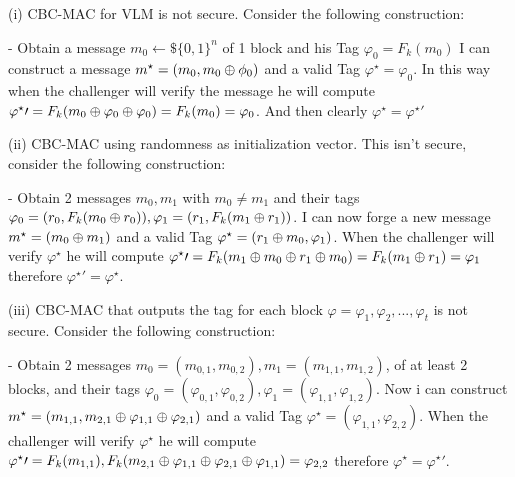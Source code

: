 \documentclass[11pt]{article}
\newcounter{t0d0_counter}
\begin{document}
\begin{figure}[h!]
   \centering
   \sdinit{}
\end{figure}

(i)
CBC-MAC for VLM is not secure. Consider the following construction:

- Obtain a message $m_0\leftarrow\$\{0,1\}^n$ of 1 block and his Tag $\varphi_0 =F_k(m_0)$
I can construct a message $m^\star=(m_0,m_0\oplus \phi_0)$ and a valid Tag $\varphi^\star=\varphi_0$.
In this way when the challenger will verify the message he will compute $\varphi^\star\prime=F_k(m_0\oplus\varphi_0\oplus\varphi_0)=F_k(m_0)=\varphi_0$. 
And then clearly $\varphi^\star=\varphi^\star\prime$

(ii)
CBC-MAC using randomness as initialization vector. This isn't secure, consider the following construction:

- Obtain 2 messages $m_0, m_1$ with $m_0\neq m_1$ and their tags $\varphi_0=(r_0,F_k(m_0\oplus r_0)), \varphi_1=(r_1,F_k(m_1\oplus r_1))$.
I can now forge a new message $m^\star=(m_0\oplus m_1)$ and a valid Tag $\varphi^\star=(r_1\oplus m_0, \varphi_1)$.
When the challenger will verify $\varphi^\star$ he will compute
$\varphi^\star\prime=F_k(m_1\oplus m_0\oplus r_1\oplus m_0)=F_k(m_1\oplus r_1)=\varphi_1$
therefore $\varphi^\star\prime=\varphi^\star$.

(iii) 
CBC-MAC that outputs the tag for each block $\varphi=\varphi_1,\varphi_2,...,\varphi_t$ is not secure. Consider the following construction:

- Obtain 2 messages $m_0=(m_{0,1},m_{0,2}), m_1=(m_{1,1},m_{1,2})$, of at least 2 blocks, and their tags 
$\varphi_0=(\varphi_{0,1},\varphi_{0,2}), \varphi_1=(\varphi_{1,1},\varphi_{1,2})$. Now i can construct 
$m^\star=(m_{1,1}, m_{2,1}\oplus\varphi_{1,1}\oplus\varphi_{2,1})$ and a valid Tag 
$\varphi^\star=(\varphi_{1,1}, \varphi_{2,2})$. When the challenger will verify $\varphi^\star$ he will compute
$\varphi^\star\prime=F_k(m_{1,1}),F_k(m_{2,1}\oplus\varphi_{1,1}\oplus\varphi_{2,1}\oplus\varphi_{1,1})=\varphi_{2,2}$
therefore $\varphi^\star=\varphi^\star\prime$.
\end{document}
